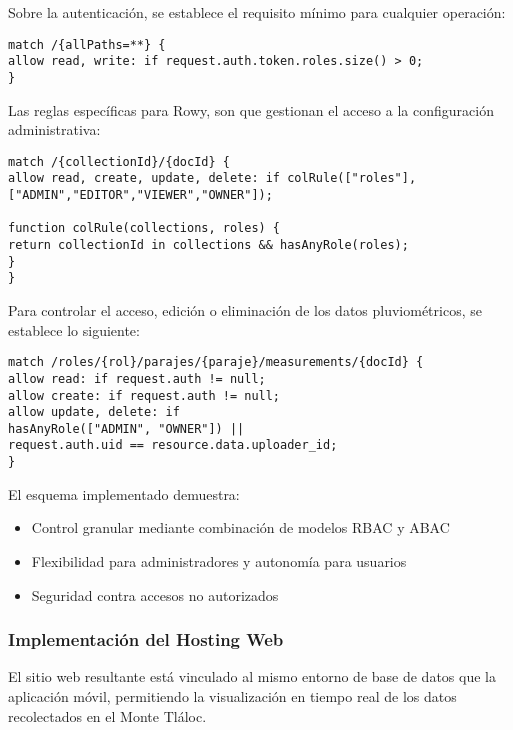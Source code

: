 Sobre la autenticación, se establece el requisito mínimo para cualquier operación:

\begin{verbatim}
match /{allPaths=**} {
allow read, write: if request.auth.token.roles.size() > 0;
}
\end{verbatim}

Las reglas específicas para Rowy, son que gestionan el acceso a la configuración administrativa:

\begin{verbatim}
match /{collectionId}/{docId} {
allow read, create, update, delete: if colRule(["roles"],
["ADMIN","EDITOR","VIEWER","OWNER"]);

function colRule(collections, roles) {
return collectionId in collections && hasAnyRole(roles);
}
}
\end{verbatim}


Para controlar el acceso, edición o eliminación de los datos pluviométricos, se establece lo siguiente:

\begin{verbatim}
match /roles/{rol}/parajes/{paraje}/measurements/{docId} {
allow read: if request.auth != null;
allow create: if request.auth != null;
allow update, delete: if
hasAnyRole(["ADMIN", "OWNER"]) ||
request.auth.uid == resource.data.uploader_id;
}
\end{verbatim}



El esquema implementado demuestra:

\begin{itemize}
\item Control granular mediante combinación de modelos RBAC y ABAC
\item Flexibilidad para administradores y autonomía para usuarios
\item Seguridad contra accesos no autorizados
\end{itemize}


 
\subsubsection{Implementación del Hosting Web}



El sitio web resultante está vinculado al mismo entorno de base de datos que la aplicación móvil, permitiendo la visualización en tiempo real de los datos recolectados en el Monte Tláloc.


